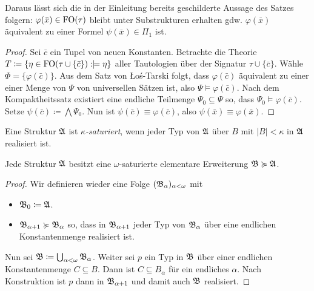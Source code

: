 Daraus lässt sich die in der Einleitung bereits geschilderte Aussage des Satzes folgern: $\varphi(\bar{x})\in \operatorname{FO}(\tau)$ bleibt unter Substrukturen erhalten gdw. $\varphi(\bar{x})$ äquivalent zu einer Formel $\psi(\bar{x})\in\Pi_1$ ist.
\begin{proof}
	Sei $\bar{c}$ ein Tupel von neuen Konstanten. Betrachte die Theorie $T\coloneqq\{\eta \in \operatorname{FO}(\tau\cup\{\bar{c}\}) : \models\eta\}$ aller Tautologien über der Signatur $\tau\cup\{\bar{c}\}$. Wähle $\Phi=\{\varphi(\bar{c})\}$. 
	Aus dem Satz von \L o\'{s}-Tarski folgt, dass $\varphi(\bar{c})$ äquivalent zu einer einer Menge von $\Psi$ von universellen Sätzen ist, also $\Psi\models\varphi(\bar{c})$.
	Nach dem Kompaktheitssatz existiert eine endliche Teilmenge $\Psi_0\subseteq\Psi$ so, dass $\Psi_0\models\varphi(\bar{c})$. Setze $\psi(\bar{c})\coloneqq\bigwedge\Psi_0$. Nun ist $\psi(\bar{c})\equiv\varphi(\bar{c})$, also $\psi(\bar{x})\equiv\varphi(\bar{x})$.
\end{proof}

\begin{definition}
	Eine Struktur $\mathfrak{A}$ ist \textit{$\kappa$-saturiert}, wenn jeder Typ von $\mathfrak{A}$ über $B$ mit $\vert B \vert<\kappa$ in $\mathfrak{A}$ realisiert ist.
\end{definition}

\begin{satz}
	Jede Struktur $\mathfrak{A}$ besitzt eine $\omega$-saturierte elementare Erweiterung $\mathfrak{B}\succcurlyeq\mathfrak{A}$.
\end{satz}
\begin{proof}
	Wir definieren wieder eine Folge $(\mathfrak{B}_\alpha)_{\alpha<\omega}$ mit
	\begin{itemize}
		\item $\mathfrak{B}_0\coloneqq\mathfrak{A}$.
		\item $\mathfrak{B}_{\alpha+1}\succcurlyeq\mathfrak{B}_\alpha$ so, dass in $\mathfrak{B}_{\alpha+1}$ jeder Typ von $\mathfrak{B}_\alpha$ über eine endlichen Konstantenmenge realisiert ist.
	\end{itemize}
	Nun sei $\mathfrak{B}\coloneqq\bigcup_{\alpha<\omega}\mathfrak{B}_\alpha$. Weiter sei $p$ ein Typ in $\mathfrak{B}$ über einer endlichen Konstantenmenge $C\subseteq B$. Dann ist $C\subseteq B_\alpha$ für ein endliches $\alpha$. Nach Konstruktion ist $p$ dann in $\mathfrak{B}_{\alpha+1}$ und damit auch $\mathfrak{B}$ realisiert.
\end{proof}

